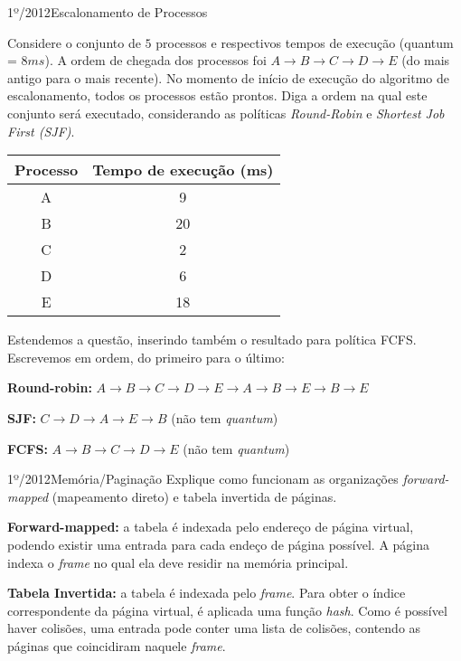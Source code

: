 \begin{exercicio}
  {1º/2012}{Escalonamento de Processos}
  {Considere o conjunto de $5$ processos e respectivos tempos de execução (quantum = $8 ms$). A ordem de chegada dos processos foi $A \rightarrow B \rightarrow C \rightarrow D \rightarrow E$ (do mais antigo para o mais recente). No momento de início de execução do algoritmo de escalonamento, todos os processos estão prontos. Diga a ordem na qual este conjunto será executado, considerando as políticas \textit{Round-Robin} e \textit{Shortest Job First (SJF)}.
  \begin{table}[h]
      \centering
      \begin{tabular}{cc}
        \hline \hline
        \textbf{Processo} & \textbf{Tempo de execução (ms)} \\ \hline
        A                 & 9                               \\
        B                 & 20                              \\
        C                 & 2                               \\
        D                 & 6                               \\
        E                 & 18                              \\
        \hline \hline
      \end{tabular}
    \end{table}
  }


    Estendemos a questão, inserindo também o resultado para política FCFS. Escrevemos em ordem, do primeiro para o último:

    \textbf{Round-robin:} $A \rightarrow B \rightarrow C \rightarrow D \rightarrow E \rightarrow A \rightarrow B \rightarrow E \rightarrow B \rightarrow E$

    \textbf{SJF:} $C \rightarrow D \rightarrow A \rightarrow E \rightarrow B$ (não tem \textit{quantum})

    \textbf{FCFS:} $A \rightarrow B \rightarrow C \rightarrow D \rightarrow E$ (não tem \textit{quantum})
\end{exercicio}

\begin{exercicio}
  {1º/2012}{Memória/Paginação}
  {Explique como funcionam as organizações \textit{forward-mapped} (mapeamento direto) e tabela invertida de páginas.}

  \textbf{Forward-mapped:} a tabela é indexada pelo endereço de página virtual, podendo existir uma entrada para cada endeço de página possível. A página indexa o \textit{frame} no qual ela deve residir na memória principal.

  \textbf{Tabela Invertida:} a tabela é indexada pelo \textit{frame}. Para obter o índice correspondente da página virtual, é aplicada uma função \textit{hash}. Como é possível haver colisões, uma entrada pode conter uma lista de colisões, contendo as páginas que coincidiram naquele \textit{frame}.
\end{exercicio}


